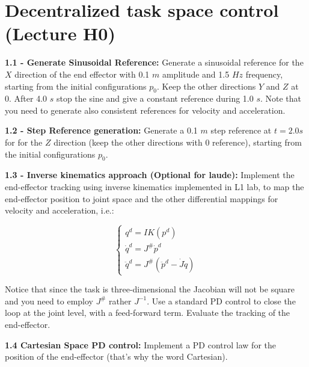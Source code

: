\documentclass[11pt]{article}
\begin{document}
\section{Decentralized task space control (Lecture H0)}

\quad

\noindent
\textbf{1.1 - Generate Sinusoidal Reference:}
Generate a sinusoidal reference for the $X$ direction of the end effector with 0.1 $m$  amplitude and 1.5 $Hz$ frequency, starting from the initial configurations $p_0$. Keep the other directions $Y$ and $Z$ at 0. After 4.0 $s$ stop the sine and give a constant reference during 1.0 $s$. Note that you need to generate also consistent references for velocity and acceleration.


\quad

\noindent
\textbf{1.2 - Step Reference generation:}
Generate a 0.1 $m$  step reference at $t= 2.0s$ for  for the $Z$ direction
 (keep the other directions with 0 reference), starting from the initial configurations $p_0$.

\quad

\noindent
\textbf{1.3 - Inverse kinematics approach (Optional  for laude):}  Implement the end-effector tracking using inverse kinematics implemented in L1 lab, to map the end-effector position to joint space and the other differential mappings for velocity and acceleration, i.e.:


\begin{equation*}
\begin{cases}
q^d = IK(p^d) \\
\dot{q}^d =  J^{\#} \dot{p}^d \\
\ddot{q}^d =  J^{\#} ( \ddot{p}^d - \dot{J}\dot{q} )
\end{cases}
\end{equation*}

Notice that since the task is three-dimensional the Jacobian will not be square and you need to employ $J^{\#}$ rather $J^{-1}$.
Use a standard PD control to close the loop at the joint level, with a feed-forward term. Evaluate the tracking of the end-effector.


\quad

\noindent
\textbf{1.4  Cartesian Space PD control:}
Implement a PD control law for the position of the end-effector (that's why the word Cartesian). 
\end{document}
